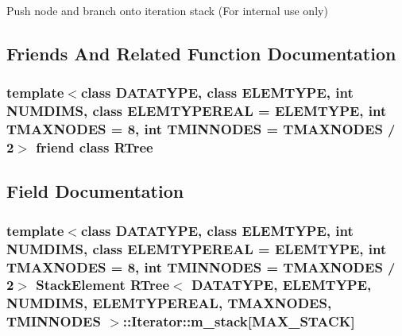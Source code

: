 Push node and branch onto iteration stack (For internal use only) 



\subsection{Friends And Related Function Documentation}
\hypertarget{classRTree_1_1Iterator_af5d7fbb9e949ef77e8d3e32670fa9dd6}{
\subsubsection[{R\-Tree}]{\setlength{\rightskip}{0pt plus 5cm}template$<$class D\-A\-T\-A\-T\-Y\-P\-E, class E\-L\-E\-M\-T\-Y\-P\-E, int N\-U\-M\-D\-I\-M\-S, class E\-L\-E\-M\-T\-Y\-P\-E\-R\-E\-A\-L = E\-L\-E\-M\-T\-Y\-P\-E, int T\-M\-A\-X\-N\-O\-D\-E\-S = 8, int T\-M\-I\-N\-N\-O\-D\-E\-S = T\-M\-A\-X\-N\-O\-D\-E\-S / 2$>$ friend class {\bf R\-Tree}\hspace{0.3cm}{\ttfamily [friend]}}}\label{classRTree_1_1Iterator_af5d7fbb9e949ef77e8d3e32670fa9dd6}


\subsection{Field Documentation}
\hypertarget{classRTree_1_1Iterator_a71a0c70b553212a62c135343831f74b0}{
\subsubsection[{m\-\_\-stack}]{\setlength{\rightskip}{0pt plus 5cm}template$<$class D\-A\-T\-A\-T\-Y\-P\-E, class E\-L\-E\-M\-T\-Y\-P\-E, int N\-U\-M\-D\-I\-M\-S, class E\-L\-E\-M\-T\-Y\-P\-E\-R\-E\-A\-L = E\-L\-E\-M\-T\-Y\-P\-E, int T\-M\-A\-X\-N\-O\-D\-E\-S = 8, int T\-M\-I\-N\-N\-O\-D\-E\-S = T\-M\-A\-X\-N\-O\-D\-E\-S / 2$>$ {\bf Stack\-Element} {\bf R\-Tree}$<$ D\-A\-T\-A\-T\-Y\-P\-E, E\-L\-E\-M\-T\-Y\-P\-E, N\-U\-M\-D\-I\-M\-S, E\-L\-E\-M\-T\-Y\-P\-E\-R\-E\-A\-L, T\-M\-A\-X\-N\-O\-D\-E\-S, T\-M\-I\-N\-N\-O\-D\-E\-S $>$\-::Iterator\-::m\-\_\-stack\mbox{[}{\bf M\-A\-X\-\_\-\-S\-T\-A\-C\-K}\mbox{]}\hspace{0.3cm}{\ttfamily [private]}}}\label{classRTree_1_1Iterator_a71a0c70b553212a62c135343831f74b0}


